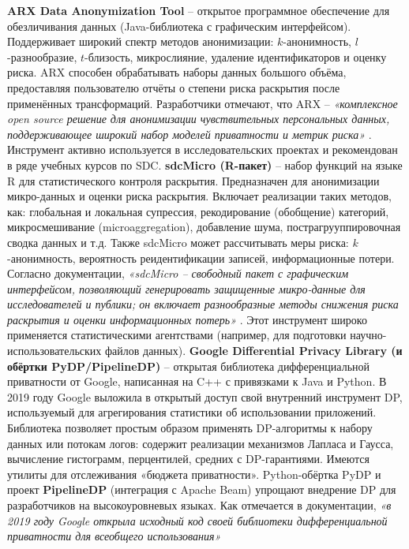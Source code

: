 \textbf{ARX Data Anonymization Tool} – открытое программное обеспечение для обезличивания данных (Java-библиотека с графическим интерфейсом). Поддерживает широкий спектр методов анонимизации: $k$-анонимность, $l$-разнообразие, $t$-близость, микрослияние, удаление идентификаторов и оценку риска. ARX способен обрабатывать наборы данных большого объёма, предоставляя пользователю отчёты о степени риска раскрытия после применённых трансформаций. Разработчики отмечают, что ARX – \textit{«комплексное open source решение для анонимизации чувствительных персональных данных, поддерживающее широкий набор моделей приватности и метрик риска»}
\autocite{arx-deidentifier-org}
. Инструмент активно используется в исследовательских проектах и рекомендован в ряде учебных курсов по SDC.
\textbf{sdcMicro (R-пакет)} – набор функций на языке R для статистического контроля раскрытия. Предназначен для анонимизации микро-данных и оценки риска раскрытия. Включает реализации таких методов, как: глобальная и локальная супрессия, рекодирование (обобщение) категорий, микросмешивание (microaggregation), добавление шума, пострагрууппировочная сводка данных и т.д. Также sdcMicro может рассчитывать меры риска: $k$-анонимность, вероятность реидентификации записей, информационные потери. Согласно документации, \textit{«sdcMicro – свободный пакет с графическим интерфейсом, позволяющий генерировать защищенные микро-данные для исследователей и публики; он включает разнообразные методы снижения риска раскрытия и оценки информационных потерь»}
\autocite{ihsn-org}
. Этот инструмент широко применяется статистическими агентствами (например, для подготовки научно-использовательских файлов данных).
\textbf{Google Differential Privacy Library (и обёртки PyDP/PipelineDP)} – открытая библиотека дифференциальной приватности от Google, написанная на C++ с привязками к Java и Python. В 2019 году Google выложила в открытый доступ свой внутренний инструмент DP, используемый для агрегирования статистики об использовании приложений. Библиотека позволяет простым образом применять DP-алгоритмы к набору данных или потокам логов: содержит реализации механизмов Лапласа и Гаусса, вычисление гистограмм, перцентилей, средних с DP-гарантиями. Имеются утилиты для отслеживания «бюджета приватности». Python-обёртка PyDP и проект \textbf{PipelineDP} (интеграция с Apache Beam) упрощают внедрение DP для разработчиков на высокоуровневых языках. Как отмечается в документации, \textit{«в 2019 году Google открыла исходный код своей библиотеки дифференциальной приватности для всеобщего использования»}
\autocite{pydp-readthedocs-io}
